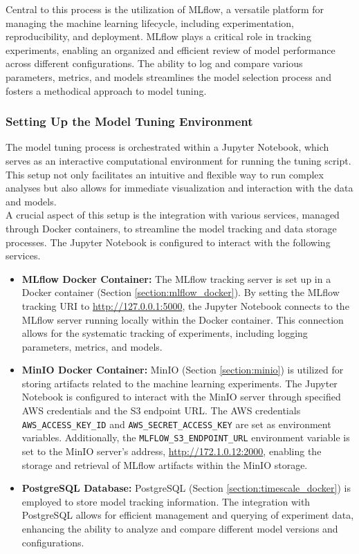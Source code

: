 Central to this process is the utilization of MLflow, a versatile platform for managing the machine learning lifecycle, including experimentation, reproducibility, and deployment. MLflow plays a critical role in tracking experiments, enabling an organized and efficient review of model performance across different configurations. The ability to log and compare various parameters, metrics, and models streamlines the model selection process and fosters a methodical approach to model tuning. \\

\subsubsection{Setting Up the Model Tuning Environment}

The model tuning process is orchestrated within a Jupyter Notebook, which serves as an interactive computational environment for running the tuning script. This setup not only facilitates an intuitive and flexible way to run complex analyses but also allows for immediate visualization and interaction with the data and models. \\

A crucial aspect of this setup is the integration with various services, managed through Docker containers, to streamline the model tracking and data storage processes. The Jupyter Notebook is configured to interact with the following services. \\

\begin{itemize}
    \item \textbf{MLflow Docker Container:} The MLflow tracking server is set up in a Docker container (Section \ref{section:mlflow_docker}). By setting the MLflow tracking URI to \url{http://127.0.0.1:5000}, the Jupyter Notebook connects to the MLflow server running locally within the Docker container. This connection allows for the systematic tracking of experiments, including logging parameters, metrics, and models.

    \item \textbf{MinIO Docker Container:} MinIO (Section \ref{section:minio}) is utilized for storing artifacts related to the machine learning experiments. The Jupyter Notebook is configured to interact with the MinIO server through specified AWS credentials and the S3 endpoint URL. The AWS credentials \texttt{AWS\_ACCESS\_KEY\_ID} and \texttt{AWS\_SECRET\_ACCESS\_KEY} are set as environment variables. Additionally, the \texttt{MLFLOW\_S3\_ENDPOINT\_URL} environment variable is set to the MinIO server's address, \url{http://172.1.0.12:2000}, enabling the storage and retrieval of MLflow artifacts within the MinIO storage.

    \item \textbf{PostgreSQL Database:} PostgreSQL (Section \ref{section:timescale_docker}) is employed to store model tracking information. The integration with PostgreSQL allows for efficient management and querying of experiment data, enhancing the ability to analyze and compare different model versions and configurations.
\end{itemize}

